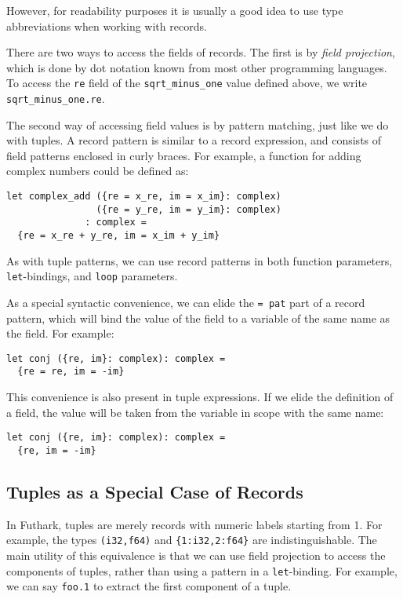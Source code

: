 \documentclass[oneside,11pt]{book}
\begin{document}
However, for readability purposes it is usually a good idea to use
type abbreviations when working with records.

There are two ways to access the fields of records.  The first is by
\textit{field projection}, which is done by dot notation known from
most other programming languages.  To access the \lstinline{re} field
of the \lstinline{sqrt_minus_one} value defined above, we write
\lstinline{sqrt_minus_one.re}.

The second way of accessing field values is by pattern matching, just
like we do with tuples.  A record pattern is similar to a record
expression, and consists of field patterns enclosed in curly braces.
For example, a function for adding complex numbers could be defined as:

\begin{lstlisting}
let complex_add ({re = x_re, im = x_im}: complex)
                ({re = y_re, im = y_im}: complex)
              : complex =
  {re = x_re + y_re, im = x_im + y_im}
\end{lstlisting}

As with tuple patterns, we can use record patterns in both function
parameters, \lstinline{let}-bindings, and \lstinline{loop} parameters.

As a special syntactic convenience, we can elide the \lstinline{= pat}
part of a record pattern, which will bind the value of the field to a
variable of the same name as the field.  For example:

\begin{lstlisting}
let conj ({re, im}: complex): complex =
  {re = re, im = -im}
\end{lstlisting}

This convenience is also present in tuple expressions. If we elide the
definition of a field, the value will be taken from the variable in
scope with the same name:

\begin{lstlisting}
let conj ({re, im}: complex): complex =
  {re, im = -im}
\end{lstlisting}

\subsection{Tuples as a Special Case of Records}

In Futhark, tuples are merely records with numeric labels starting
from 1.  For example, the types \lstinline{(i32,f64)} and
\lstinline!{1:i32,2:f64}! are indistinguishable.  The main utility of
this equivalence is that we can use field projection to access the
components of tuples, rather than using a pattern in a
\lstinline{let}-binding.  For example, we can say \lstinline{foo.1} to
extract the first component of a tuple.
\end{document}

